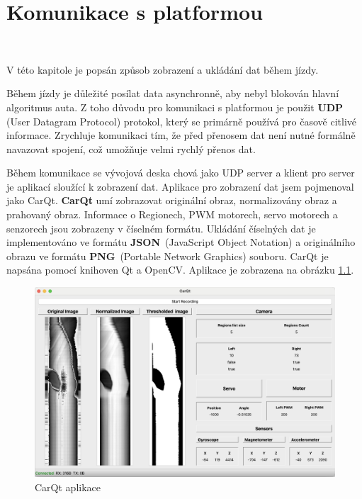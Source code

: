 \chapter{Komunikace s platformou}
\label{sec:PlatformCommunication}
\vspace{-20pt}
\

V této kapitole je popsán způsob zobrazení a ukládání dat během jízdy.

Během jízdy je důležité posílat data asynchronně, aby nebyl blokován hlavní
algoritmus auta. Z toho důvodu pro komunikaci s platformou je použit \textbf{UDP}
(User Datagram Protocol) protokol, který se primárně používá pro časově citlivé
informace. Zrychluje komunikaci tím, že před přenosem dat není nutné formálně
navazovat spojení, což umožňuje velmi rychlý přenos dat\cite{UDP}.

Během komunikace se vývojová deska chová jako UDP server a klient pro server je
aplikací sloužící k zobrazení dat. Aplikace pro zobrazení dat jsem pojmenoval jako
CarQt. \textbf{CarQt} umí zobrazovat originální obraz, normalizovány obraz a
prahovaný obraz. Informace o Regionech, PWM motorech, servo motorech a senzorech
jsou zobrazeny v číselném formátu. Ukládání číselných dat je implementováno ve
formátu \textbf{JSON}~(JavaScript Object Notation) a originálního obrazu ve formátu
\textbf{PNG}~(Portable Network Graphics) souboru. CarQt je napsána pomocí knihoven
Qt a OpenCV. Aplikace je zobrazena na obrázku \ref{fig:CarQt}.
\begin{figure}[!h]
    \centering
    \includegraphics[width = .7\linewidth]{Figures/CarQt.png}
    \caption{CarQt aplikace}
    \label{fig:CarQt}
\end{figure}

